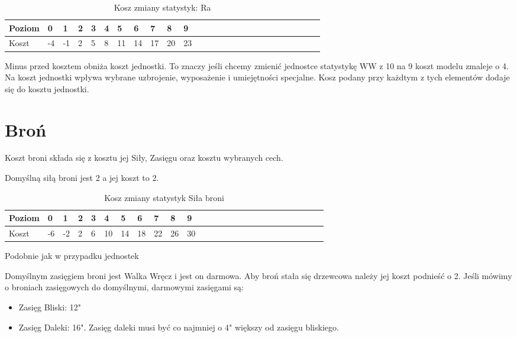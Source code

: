 \begin{table}[h]
\caption{Kosz zmiany statystyk: Ra}
    \begin{tabular}{|l|l|l|l|l|l|l|l|l|l|l|l|l|l|l|l|l|l|l|l|l|l|l|l|l|l|}
    \hline
    Poziom & 0 & 1 & 2 & 3 & 4 & 5 & 6 & 7 & 8 & 9 \\ \hline
    Koszt  & -4 & -1 & 2 & 5 & 8 & 11 & 14 & 17 & 20 & 23 \\ \hline
    \end{tabular}
\end{table}

Minus przed kosztem obniża koszt jednostki. To znaczy  jeśli chcemy zmienić jednostce statystykę WW z 10 na 9 koszt modelu zmaleje o 4. 
Na koszt jednostki wpływa wybrane uzbrojenie, wyposażenie i umiejętności specjalne. Kosz podany przy każdtym z tych elementów dodaje się do kosztu jednostki. 

\section{Broń}

Koszt broni składa się z kosztu jej Siły, Zasięgu oraz kosztu wybranych cech. 


Domyślną siłą broni jest 2 a jej koszt to 2.
\begin{table}[h]
\caption{Kosz zmiany statystyk Siła broni}
    \begin{tabular}{|l|l|l|l|l|l|l|l|l|l|l|l|l|l|l|l|l|l|l|l|l|l|l|l|l|l|}
    \hline
    Poziom & 0 & 1 & 2 & 3 & 4 & 5 & 6 & 7 & 8 & 9 \\ \hline
    Koszt  & -6 & -2 & 2 & 6 & 10 & 14 & 18 & 22 & 26 & 30 \\ \hline
    \end{tabular}
\end{table}

Podobnie jak w przypadku jednostek 

Domyślnym zasięgiem broni jest Walka Wręcz i jest on darmowa. Aby broń stała się drzewcowa należy jej koszt podnieść o 2. 
Jeśli mówimy o broniach zasięgowych do domyślnymi, darmowymi zasięgami są: 
\begin{itemize}
    \item Zasięg Bliski: 12"
    \item Zasięg Daleki: 16". Zasięg daleki musi być co najmniej o 4" większy od zasięgu bliskiego. 
\end{itemize}

